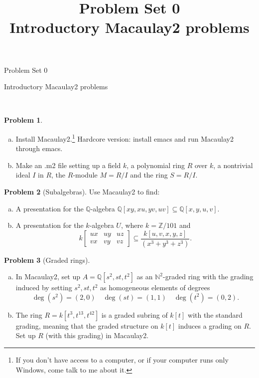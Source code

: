 \documentclass[11pt]{article}
\title{}
\date{\vspace{-0.5in}}
\title{Problem Set 0 \\ Introductory Macaulay2 problems}
\theoremstyle{definition}
\newtheorem{problem}{Problem}
\begin{document}
\thispagestyle{fancy}
\pagestyle{fancy}


\begin{center}
	{\LARGE Problem Set 0\\
	
	\vspace{0.5em}
	
	Introductory Macaulay2 problems}
\end{center}

\


\begin{problem} $\,$
\begin{enumerate}[a)]
	\item Install Macaulay2.\footnote{If you don't have access to a computer, or if your computer runs only Windows, come talk to me about it.} Hardcore version: install emacs and run Macaulay2 through emacs.
	\item Make an .m2 file setting up a field $k$, a polynomial ring $R$ over $k$, a nontrivial ideal $I$ in $R$, the $R$-module $M = R/I$ and the ring $S = R/I$.
\end{enumerate}
\end{problem}




\begin{problem}[Subalgebras]
	Use Macaulay2 to find:
	\begin{enumerate}[a)]
		\item A presentation for the $\mathbb{Q}$-algebra $\mathbb{Q}[xy,xu,yv,uv] \subseteq \mathbb{Q}[x,y,u,v]$.
		\item A presentation for the $k$-algebra $U$, where $k = \mathbb{Z}/101$ and
		$$k \begin{bmatrix} ux & uy & uz \\ vx & vy & vz \end{bmatrix} \subseteq \frac{k[u,v,x,y,z]}{(x^3+y^3+z^3)}.$$
	\end{enumerate}
\end{problem}



\begin{problem}[Graded rings]
$\,$
	\begin{enumerate}[a)]
		\item In Macaulay2, set up $A = \mathbb{Q}[s^2,st,t^2]$ as an $\mathbb{N}^2$-graded ring with the grading induced by setting $s^2, st, t^2$ as homogeneous elements of degrees
		$$\deg(s^2) = (2,0) \quad \deg(st) = (1,1) \quad \deg(t^2) = (0,2).$$
		\item The ring $R=k[t^3,t^{13},t^{42}]$ is a graded subring of $k[t]$ with the standard grading, meaning that the graded structure on $k[t]$ induces a grading on $R$. Set up $R$ (with this grading) in Macaulay2.
	\end{enumerate}
\end{problem}
\end{document}
